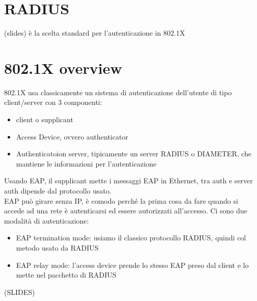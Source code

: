 \documentclass[12pt, oneside]{extbook} %
\begin{document}
\section{RADIUS}
(slides) è la scelta standard per l'autenticazione in 802.1X
\section{802.1X overview}
802.1X usa classicamente un sistema di autenticazione dell'utente di tipo client/server con 3 componenti:
\begin{itemize}
\item client o supplicant
\item Access Device, ovvero authenticator
\item Authenticatoion server, tipicamente un server RADIUS o DIAMETER, che mantiene le informazioni per l'autenticazione
\end{itemize}
Usando EAP, il supplicant mette i messaggi EAP in Ethernet, tra auth e server auth dipende dal protocollo usato. \\EAP può girare senza IP, è comodo perché la prima cosa da fare quando si accede ad una rete è autenticarsi ed essere autorizzati all'accesso. Ci sono due modalità di autenticazione:
\begin{itemize}
\item EAP termination mode: usiamo il classico protocollo RADIUS, quindi col metodo usato da RADIUS
\item EAP relay mode: l'access device prende lo stesso EAP preso dal client e lo mette nel pacchetto di RADIUS
\end{itemize}
(SLIDES)
\end{document}
